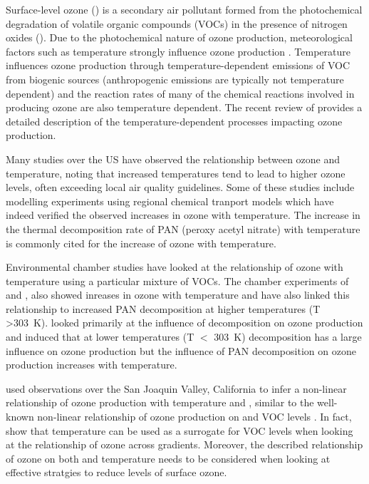 Surface-level ozone () is a secondary air pollutant formed from the photochemical degradation of volatile organic compounds (VOCs) in the presence of nitrogen oxides ().
Due to the photochemical nature of ozone production, meteorological factors such as temperature strongly influence ozone production \citep{Jacob:2009}.
Temperature influences ozone production through temperature-dependent emissions of VOC from biogenic sources (anthropogenic emissions are typically not temperature dependent) and the reaction rates of many of the chemical reactions involved in producing ozone are also temperature dependent.
The recent review of \citet{Pusede:2015} provides a detailed description of the temperature-dependent processes impacting ozone production.

Many studies over the US \citep{Sillman:1995a, Aw:2003, Pusede:2014} have observed the relationship between ozone and temperature, noting that increased temperatures tend to lead to higher ozone levels, often exceeding local air quality guidelines.
Some of these studies \citep{Sillman:1995a, Aw:2003} include modelling experiments using regional chemical tranport models which have indeed verified the observed increases in ozone with temperature.
The increase in the thermal decomposition rate of PAN (peroxy acetyl nitrate) with temperature is commonly cited for the increase of ozone with temperature.

Environmental chamber studies have looked at the relationship of ozone with temperature using a particular mixture of VOCs.
The chamber experiments of \citet{Carter:1979} and \citet{Hatakeyama:1991}, also showed inreases in ozone with temperature and have also linked this relationship to increased PAN decomposition at higher temperatures (T \textgreater 303~K).
\citet{Hatakeyama:1991} looked primarily at the influence of  decomposition on ozone production and induced that at lower temperatures (T $<$ 303~K)  decomposition has a large influence on ozone production but the influence of PAN decomposition on ozone production increases with temperature.

\citet{Pusede:2014} used observations over the San Joaquin Valley, California to infer a non-linear relationship of ozone production with temperature and , similar to the well-known non-linear relationship of ozone production on  and VOC levels \citep{Sillman:1999}.
In fact, \citet{Pusede:2014} show that temperature can be used as a surrogate for VOC levels when looking at the relationship of ozone across  gradients.
Moreover, the described relationship of ozone on both  and temperature needs to be considered when looking at effective stratgies to reduce levels of surface ozone.

